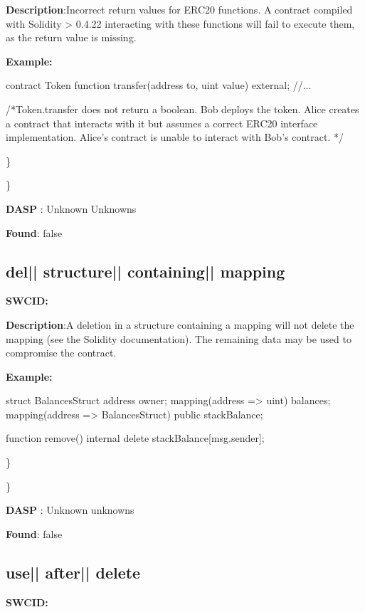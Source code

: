 \documentclass{article}
\begin{document}
\textbf{Description}:Incorrect return values for ERC20 functions. A contract compiled with Solidity > 0.4.22 interacting with these functions will fail to execute them, as the return value is missing.


\textbf{Example:} 
\begin{ffcode} 

contract Token{
    function transfer(address to, uint value) external;
    //...
}

 /*Token.transfer does not return a boolean. Bob deploys the token. Alice creates a contract that interacts with it but assumes a correct ERC20 interface implementation. Alice's contract is unable to interact with Bob's contract. */ 

\end{ffcode} 
\} 

\} 

\textbf{DASP} : Unknown Unknowns

\textbf{Found}: false

\subsection{del{|\textunderscore| }structure{|\textunderscore| }containing{|\textunderscore| }mapping} 
\textbf{SWC{\textunderscore }ID:} 

\textbf{Description}:A deletion in a structure containing a mapping will not delete the mapping (see the Solidity documentation). The remaining data may be used to compromise the contract.


\textbf{Example:} 
\begin{ffcode} 

struct BalancesStruct{
    address owner;
    mapping(address => uint) balances;
}
mapping(address => BalancesStruct) public stackBalance;

function remove() internal{
      delete stackBalance[msg.sender];
}

\end{ffcode} 
\} 

\} 

\textbf{DASP} : Unknown unknowns

\textbf{Found}: false

\subsection{use{|\textunderscore| }after{|\textunderscore| }delete} 
\textbf{SWC{\textunderscore }ID:} 
\end{document}
